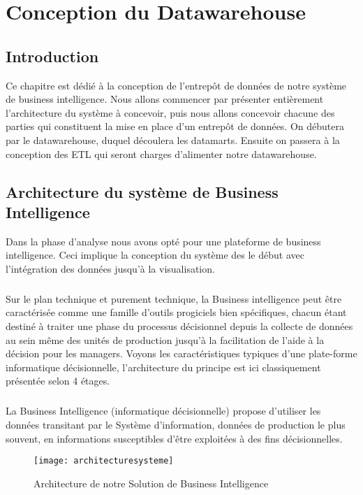 \chapter{Conception du Datawarehouse}

\section*{Introduction}%
%
Ce chapitre est dédié à la conception de l’entrepôt de données de notre système de business intelligence. Nous allons commencer par présenter entièrement l’architecture du système à concevoir, puis nous allons concevoir chacune des parties qui constituent la mise en place d’un entrepôt de données. On débutera par le datawarehouse, duquel découlera les datamarts. Ensuite on passera à la conception des ETL qui seront charges d’alimenter notre datawarehouse.

\section{Architecture du système de Business Intelligence}
Dans la phase d’analyse nous avons opté pour une plateforme de business intelligence. Ceci implique la conception du système des le début avec l’intégration des données jusqu’à la visualisation. 
\paragraph{}
Sur le plan technique et purement technique, la Business intelligence peut être caractérisée comme une famille d'outils progiciels bien spécifiques, chacun étant destiné à traiter une phase du processus décisionnel depuis la collecte de données au sein même des unités de production jusqu'à la facilitation de l'aide à la décision pour les managers. Voyons les caractéristiques typiques d'une plate-forme informatique décisionnelle, l'architecture du principe est ici classiquement présentée selon 4 étages.
\paragraph{}
La Business Intelligence (informatique décisionnelle) propose d'utiliser les données transitant par le Système d'information, données de production le plus souvent, en informations susceptibles d'être exploitées à des fins décisionnelles.

\begin{figure}[H]
    \centering
    \texttt{[image: architecturesysteme]}
    \caption{Architecture de notre Solution de Business Intelligence}
    \label{fig:architecturesysteme}
\end{figure}

